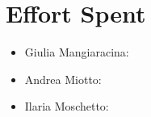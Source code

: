 \chapter{Effort Spent}

\begin{itemize}
\item Giulia Mangiaracina: 
\item Andrea Miotto: 
\item Ilaria Moschetto: 

\end{itemize}